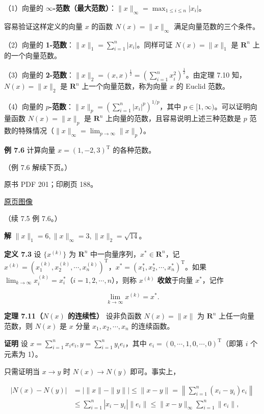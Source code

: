 \documentclass[
  10pt,
  fontset=fandol]{ctexart}
\begin{document}
（1）向量的
\textbf{\(\infty\)-范数（最大范数）}：\(\|x\|_\infty=\max_{1\leqslant i\leqslant n}|x_i|\)。

容易验证这样定义的向量 \(x\) 的函数 \(N(x)=\|x\|_\infty\)
满足向量范数的三个条件。

（2）向量的 \textbf{1-范数}：\(\|x\|_1=\sum_{i=1}^{n}|x_i|\)。同样可证
\(N(x)=\|x\|_1\) 是 \(\mathbf R^n\) 上的一个向量范数。

（3）向量的
\textbf{2-范数}：\(\|x\|_2=(x,x)^{\frac12}=\left(\sum_{i=1}^{n}x_i^2\right)^{\frac12}\)。由定理
7.10 知，\(N(x)=\|x\|_2\) 是 \(\mathbf R^n\) 上一个向量范数，称为向量
\(x\) 的 Euclid 范数。

（4）向量的
\textbf{\(p\)-范数}：\(\|x\|_p=\left(\sum_{i=1}^{n}|x_i|^p\right)^{1/p}\)，其中
\(p\in[1,\infty)\)。可以证明向量函数 \(N(x)=\|x\|_p\) 是 \(\mathbf R^n\)
上向量的范数，且容易说明上述三种范数是 \(p\)
范数的特殊情况（\(\|x\|_\infty=\lim_{p\to\infty}\|x\|_p\)）。

\textbf{例 7.6} 计算向量 \(x=(1,-2,3)^{\mathrm T}\) 的各种范数。

（例 7.6 解续下页。）

\clearpage

原书 PDF 201；印刷页 188。

\href{../../../source-images/pdf-201.jpeg}{原页图像}

（续 7.5 例 7.6。）

\textbf{解} \(\|x\|_1=6,\|x\|_\infty=3,\|x\|_2=\sqrt{14}\)。

\textbf{定义 7.3} 设 \(\{x^{(k)}\}\) 为 \(\mathbf R^n\)
中一向量序列，\(x^*\in\mathbf R^n\)，记
\(x^{(k)}=(x_1^{(k)},x_2^{(k)},\cdots,x_n^{(k)})^{\mathrm T}\)，\(x^*=(x_1^*,x_2^*,\cdots,x_n^*)^{\mathrm T}\)。如果
\(\lim_{k\to\infty}x_i^{(k)}=x_i^*\)（\(i=1,2,\cdots,n\)），则称
\(x^{(k)}\) \textbf{收敛}于向量 \(x^*\)，记作

\[
\lim_{k\to\infty}x^{(k)}=x^*.
\]

\textbf{定理 7.11（\(N(x)\) 的连续性）} 设非负函数 \(N(x)=\|x\|\) 为
\(\mathbf R^n\) 上任一向量范数，则 \(N(x)\) 是 \(x\) 分量
\(x_1,x_2,\cdots,x_n\) 的连续函数。

\textbf{证明} 设 \(x=\sum_{i=1}^{n}x_ie_i,y=\sum_{i=1}^{n}y_ie_i\)，其中
\(e_i=(0,\cdots,1,0,\cdots,0)^{\mathrm T}\)（即第 \(i\) 个元素为 1）。

只需证明当 \(x\to y\) 时 \(N(x)\to N(y)\) 即可。事实上，

\[
\begin{aligned}
|N(x)-N(y)|
&=\big|\|x\|-\|y\|\big|\leqslant\|x-y\|
=\left\|\sum_{i=1}^{n}(x_i-y_i)e_i\right\|\\
&\leqslant\sum_{i=1}^{n}|x_i-y_i|\|e_i\|
\leqslant\|x-y\|_\infty\sum_{i=1}^{n}\|e_i\|,
\end{aligned}
\]
\end{document}

